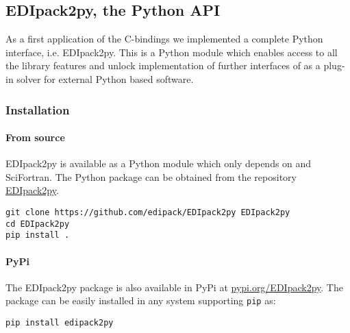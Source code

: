 \documentclass[edipack2.tex]{subfiles}
\begin{document}




\subsection{EDIpack2py, the Python API}\label{sSecInteropEDIpy}
As a first application of the \NAME C-bindings we implemented a
complete Python interface, i.e. EDIpack2py. This is a Python module which
enables access to all the library features and unlock implementation of
further interfaces of \NAME as a plug-in solver for external Python
based software.    


\subsubsection{Installation}\label{sSecInteropEDIpyInstallation}
\paragraph{From source}
EDIpack2py is available as a Python
module which only depends on \NAME and SciFortran.
The Python package can be obtained from the repository
\href{https://github.com/EDIpack/EDIpack2py}{EDIpack2py}.

\begin{lstlisting}[style=mybash]
git clone https://github.com/edipack/EDIpack2py EDIpack2py
cd EDIpack2py
pip install . 
\end{lstlisting}

\paragraph{PyPi}
The EDIpack2py package is also available in PyPi at
\href{https://pypi.org/project/EDIpack2py/}{pypi.org/EDIpack2py}. The package can be easily installed in any system supporting {\tt pip} as:

\begin{lstlisting}[style=mybash]
pip install edipack2py
\end{lstlisting}

\end{document}
